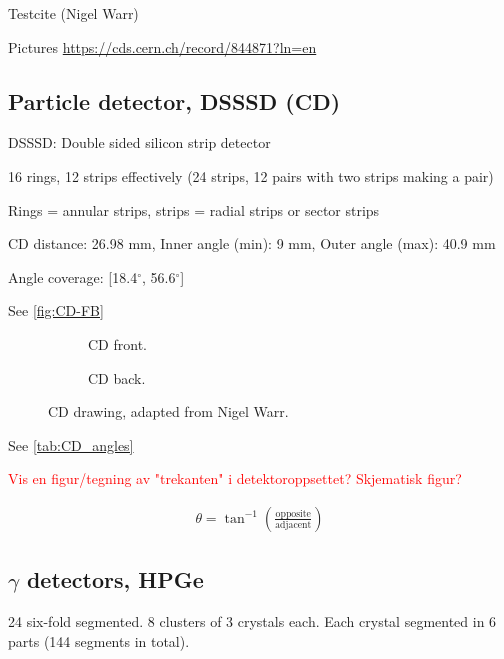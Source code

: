 \documentclass[twoside,english]{uiofysmaster/uiofysmaster}
\let\orgautoref\autoref
\renewcommand{\autoref}
        {\def\equationautorefname{Eq.}%
         \def\figureautorefname{Fig.}%
         \def\subfigureautorefname{Fig.}%
         \def\sectionautorefname{Sec.}%
         \def\subsectionautorefname{Sec.}%
         \def\subsubsectionautorefname{Sec.}%
         \def\Itemautorefname{item}%
         \def\tableautorefname{Tab.}%
         \orgautoref}
\begin{document}
Testcite (Nigel Warr) \cite{NWarr}


Pictures \url{https://cds.cern.ch/record/844871?ln=en}

\subsection{Particle detector, DSSSD (CD)}

DSSSD: Double sided silicon strip detector

16 rings, 12 strips effectively (24 strips, 12 pairs with two strips making a pair)

Rings = annular strips, strips = radial strips or sector strips

CD distance: 26.98 mm, Inner angle (min): 9 mm, Outer angle (max): 40.9 mm

Angle coverage: [18.4$^\circ$, 56.6$^\circ$]

See \autoref{fig:CD-FB}


\begin{figure}
	\centering
	\begin{subfigure}{\textwidth}
		
		\caption{CD front.}
		\label{fig:CD-F}
	\end{subfigure}
	\begin{subfigure}{\textwidth}
		
		\caption{CD back.}
		\label{fig:CD-B}
	\end{subfigure}
	\caption{CD drawing, adapted from Nigel Warr.}
	\label{fig:CD-FB}
\end{figure}




See \autoref{tab:CD_angles}

\begin{table}[ht] 
    \centering 
	
\end{table}


\textcolor{red}{Vis en figur/tegning av "trekanten" i detektoroppsettet? Skjematisk figur?} 

\begin{align*}
	\theta = \tan^{-1} \left( \frac{\text{opposite}}{\text{adjacent}} \right)
\end{align*}

\subsection{\texorpdfstring{$\gamma$}{Gamma} detectors, HPGe}

24 six-fold segmented. 8 clusters of 3 crystals each. Each crystal segmented in 6 parts (144 segments in total).
\end{document}
